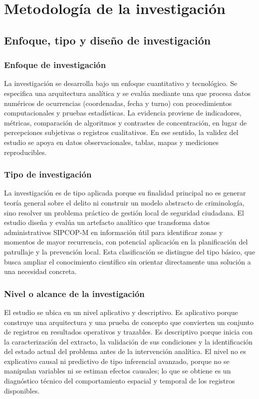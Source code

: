 \chapter{Metodología de la investigación}

\section{Enfoque, tipo y diseño de investigación}

\subsection{Enfoque de investigación}

La investigación se desarrolla bajo un enfoque cuantitativo y tecnológico. Se especifica una arquitectura analítica y se evalúa mediante una  que procesa datos numéricos de ocurrencias (coordenadas, fecha y turno) con procedimientos computacionales y pruebas estadísticas. La evidencia proviene de indicadores, métricas, comparación de algoritmos y contrastes de concentración, en lugar de percepciones subjetivas o registros cualitativos. En ese sentido, la validez del estudio se apoya en datos observacionales, tablas, mapas y mediciones reproducibles.

\subsection{Tipo de investigación}

La investigación es de tipo aplicada porque su finalidad principal no es generar teoría general sobre el delito ni construir un modelo abstracto de criminología, sino resolver un problema práctico de gestión local de seguridad ciudadana. El estudio diseña y evalúa un artefacto analítico que transforma datos administrativos SIPCOP-M en información útil para identificar zonas y momentos de mayor recurrencia, con potencial aplicación en la planificación del patrullaje y la prevención local. Esta clasificación se distingue del tipo básico, que busca ampliar el conocimiento científico sin orientar directamente una solución a una necesidad concreta.

\subsection{Nivel o alcance de la investigación}

El estudio se ubica en un nivel aplicativo y descriptivo. Es aplicativo porque construye una arquitectura y una prueba de concepto que convierten un conjunto de registros en resultados operativos y trazables. Es descriptivo porque inicia con la caracterización del extracto, la validación de sus condiciones y la identificación del estado actual del problema antes de la intervención analítica. El nivel no es explicativo causal ni predictivo de tipo inferencial avanzado, porque no se manipulan variables ni se estiman efectos causales; lo que se obtiene es un diagnóstico técnico del comportamiento espacial y temporal de los registros disponibles.


